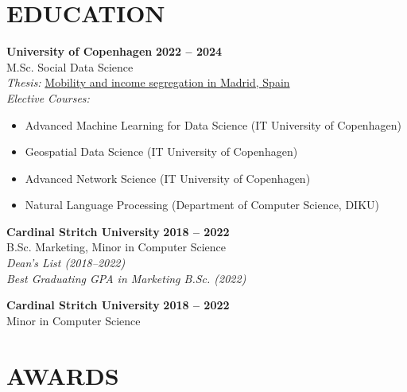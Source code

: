 \documentclass{resume}
\begin{document}
\section{EDUCATION} 
\begin{content}
    {\bf University of Copenhagen} \hfill {\bf 2022 -- 2024} \\
    M.Sc. Social Data Science \\
    {\em Thesis:} {\href{https://carobs9.github.io/segregation-mobility/}{Mobility and income segregation in Madrid, Spain}} \\
    {\em Elective Courses:}
    \begin{itemize}[noitemsep, topsep=0pt, leftmargin=*]
        \item Advanced Machine Learning for Data Science (IT University of Copenhagen)
        \item Geospatial Data Science (IT University of Copenhagen)
        \item Advanced Network Science (IT University of Copenhagen)
        \item Natural Language Processing (Department of Computer Science, DIKU)
    \end{itemize}

    \medskip

    {\bf Cardinal Stritch University} \hfill {\bf 2018 -- 2022} \\
    B.Sc. Marketing, Minor in Computer Science \\
    {\em Dean's List (2018--2022)} \\
    {\em Best Graduating GPA in Marketing B.Sc. (2022)}

    {\bf Cardinal Stritch University} \hfill {\bf 2018 -- 2022} \\
    Minor in Computer Science \\
\sectionlineskip
\end{content}

\section{AWARDS} 
\begin{content}
\sectionlineskip
\end{content}

\end{document}
